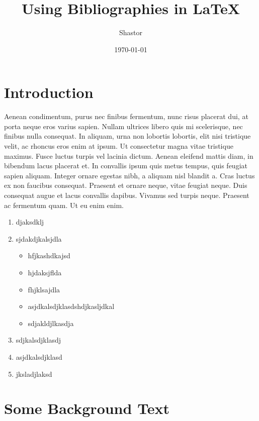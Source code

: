 \documentclass{article}
\begin{document}
    \title{Using Bibliographies in \LaTeX}
    \author{Shastor}
    \date{\today}
    \maketitle

    
    \section{Introduction}
    Aenean condimentum, purus nec finibus fermentum, nunc risus placerat dui, at porta neque eros varius sapien. Nullam ultrices libero quis mi scelerisque, nec finibus nulla consequat. In aliquam, urna non lobortis lobortis, elit nisi tristique velit, ac rhoncus eros enim at ipsum. Ut consectetur magna vitae tristique maximus. Fusce luctus turpis vel lacinia dictum. Aenean eleifend mattis diam, in bibendum lacus placerat et. In convallis ipsum quis metus tempus, quis feugiat sapien aliquam. Integer ornare egestas nibh, a aliquam nisl blandit a. Cras luctus ex non faucibus consequat. Praesent et ornare neque, vitae feugiat neque. Duis consequat augue et lacus convallis dapibus. Vivamus sed turpis neque. Praesent ac fermentum quam. Ut eu enim enim.

    \begin{enumerate}
        \item djaksdklj
        \item sjdakdjkalsjdla
        \begin{itemize}
            \item hfjkashdkajsd
            \item hjdaksjflda
            \item fhjklsajdla
            \item asjdkalsdjklasdshdjkasljdkal
            \item sdjakldjlkasdja
        \end{itemize}
        \item sdjkalsdjklasdj
        \item asjdkalsdjklasd
        \item jksladjlaksd
    \end{enumerate}

    \section{Some Background Text}
\end{document}
